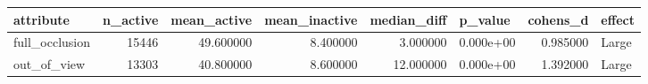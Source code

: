 \begin{tabular}{lrrrrlrl}
\toprule
attribute & n_active & mean_active & mean_inactive & median_diff & p_value & cohens_d & effect \\
\midrule
full_occlusion & 15446 & 49.600000 & 8.400000 & 3.000000 & 0.000e+00 & 0.985000 & Large \\
out_of_view & 13303 & 40.800000 & 8.600000 & 12.000000 & 0.000e+00 & 1.392000 & Large \\
\bottomrule
\end{tabular}
